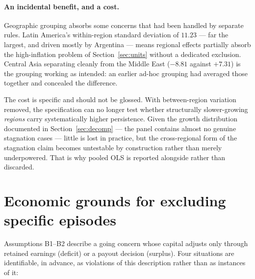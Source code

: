\documentclass[11pt]{article}
\begin{document}
\paragraph{An incidental benefit, and a cost.} Geographic grouping absorbs
some concerns that had been handled by separate rules. Latin America's
within-region standard deviation of $11.23$ --- far the largest, and driven
mostly by Argentina --- means regional effects partially absorb the
high-inflation problem of Section~\ref{sec:units} without a dedicated
exclusion. Central Asia separating cleanly from the Middle East
($-8.81$ against $+7.31$) is the grouping working as intended: an earlier
ad-hoc grouping had averaged those together and concealed the difference.

The cost is specific and should not be glossed. With between-region
variation removed, the specification can no longer test whether
structurally slower-growing \emph{regions} carry systematically higher
persistence. Given the growth distribution documented in
Section~\ref{sec:decomp} --- the panel contains almost no genuine
stagnation cases --- little is lost in practice, but the cross-regional
form of the stagnation claim becomes untestable by construction rather
than merely underpowered. That is why pooled OLS is reported alongside
rather than discarded.

\section{Economic grounds for excluding specific episodes}
\label{sec:exclusions}

Assumptions B1--B2 describe a going concern whose capital adjusts only
through retained earnings (deficit) or a payout decision (surplus). Four
situations are identifiable, in advance, as violations of this description
rather than as instances of it:
\end{document}
